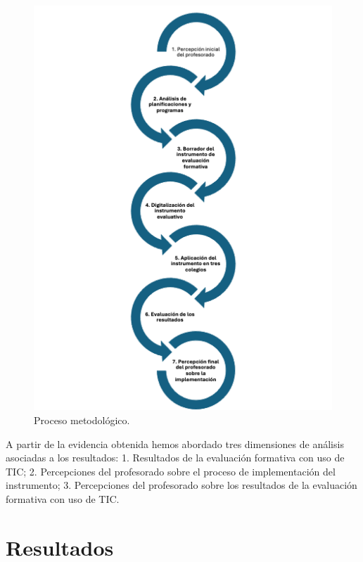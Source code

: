 \documentclass[spanish]{textolivre}
\begin{document}
\begin{figure}[h!]
    \centering
    \begin{minipage}{0.8\linewidth}
    \includegraphics[width=\linewidth]{imagens/image4.png}
    \caption{Proceso metodológico.}\label{fig-4}
    \end{minipage}
\end{figure}

A partir de la evidencia obtenida hemos abordado tres dimensiones de análisis asociadas a los resultados: 1. Resultados de la evaluación formativa con uso de TIC; 2. Percepciones del profesorado sobre el proceso de implementación del instrumento; 3. Percepciones del profesorado sobre los resultados de la evaluación formativa con uso de TIC.

\section{Resultados}
\end{document}
